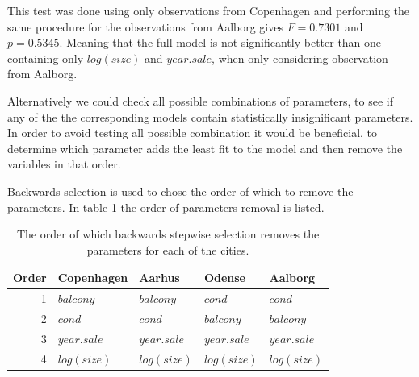     This test was done using only observations from Copenhagen and performing the same procedure for the observations from Aalborg gives $F=0.7301$ and $p=0.5345$.
    Meaning that the full model is not significantly better than one containing only $log(size)$ and $year.sale$, when only considering observation from Aalborg.
    
    Alternatively we could check all possible combinations of parameters, to see if any of the the corresponding models contain statistically insignificant parameters.
    In order to avoid testing all possible combination it would be beneficial, to determine which parameter adds the least fit to the model and then remove the variables in that order. 


Backwards selection is used to chose the order of which to remove the parameters.
In table \ref{tbl:backward_order_of_parameters} the order of parameters removal is listed.
    
\begin{table}[H]
    \centering
    \begin{tabular}{r|llll}
        \toprule
        \textbf{Order} & \textbf{Copenhagen} & \textbf{Aarhus} & \textbf{Odense} & \textbf{Aalborg}\\
        \midrule
        1 & $balcony$              & $balcony$         & $cond$            & $cond$ \\
        2 & $cond$           & $cond$            & $balcony$         & $balcony$ \\
        3 & $year.sale$    & $year.sale$  & $year.sale$  & $year.sale$ \\
        4 & $log(size)$         & $log(size)$       & $log(size)$       & $log(size)$ \\
        \bottomrule
    \end{tabular}
    \caption{The order of which backwards stepwise selection removes the parameters for each of the cities.}
    \label{tbl:backward_order_of_parameters}
\end{table}


